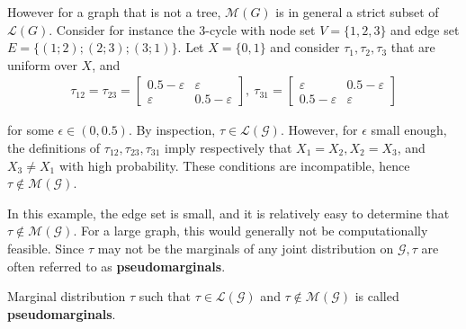 \documentclass[11pt]{elegantbook}
\begin{document}
\begin{example}
    However for a graph that is not a tree, $\mathcal{M}(G)$ is in general a strict subset of $\mathcal{L}(G)$. Consider
    for instance the $3$-cycle with node set $V = \{1, 2, 3\}$ and edge set $E = \{(1; 2); (2; 3); (3; 1)\}$.
    Let $X=\{0,1\}$ and consider $\tau_1,\tau_2,\tau_3$ that are uniform over $X$, and
    \begin{equation}
        \begin{aligned}
            \tau_{12}=\tau_{23}=\begin{bmatrix}
                0.5-\varepsilon&\varepsilon\\
                \varepsilon&0.5-\varepsilon
            \end{bmatrix},\ \tau_{31}=\begin{bmatrix}
                \varepsilon&0.5-\varepsilon\\
                0.5-\varepsilon&\varepsilon
            \end{bmatrix}
        \end{aligned}
        \nonumber
    \end{equation}
\end{example}
for some $\epsilon \in(0,0.5)$. By inspection, $\tau \in \mathcal{L}(\mathcal{G})$. However, for $\epsilon$ small enough, the definitions of $\tau_{12}, \tau_{23}, \tau_{31}$ imply respectively that $X_1=X_2, X_2=X_3$, and $X_3 \neq X_1$ with high probability. These conditions are incompatible, hence $\tau \notin \mathcal{M}(\mathcal{G})$.

In this example, the edge set is small, and it is relatively easy to determine that $\tau \notin \mathcal{M}(\mathcal{G})$. For a large graph, this would generally not be computationally feasible. Since $\tau$ may not be the marginals of any joint distribution on $\mathcal{G}, \tau$ are often referred to as \textbf{pseudomarginals}.

\begin{definition}[pseudomarginal]
    Marginal distribution $\tau$ such that $\tau\in \mathcal{L}(\mathcal{G})$ and $\tau\notin \mathcal{M}(\mathcal{G})$ is called \textbf{pseudomarginals}.
\end{definition}
\end{document}
